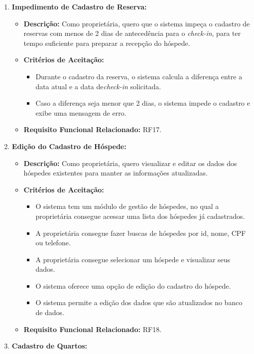 \documentclass[
	12pt,				%
	openany,			%
	oneside,			%
	a4paper,			%
	english,			%
	french,				%
	spanish,			%
	brazil				%
	]{abntex2}
\begin{document}
\begin{enumerate}[label=\textbf{\arabic*.}]
\begin{itemize}
	\end{itemize} 
	\item \textbf{Impedimento de Cadastro de Reserva:}
	\begin{itemize}
		\item \textbf{Descrição:} Como proprietária, quero que o sistema impeça o cadastro de reservas com menos de  2 dias de antecedência para o \textit{check-in}, para ter tempo suficiente para preparar a recepção do hóspede.
		\item \textbf{Critérios de Aceitação:}
		\begin{itemize}
			\item Durante o cadastro da reserva, o sistema calcula a diferença entre a data atual e a data de\textit{check-in} solicitada.
			\item Caso a diferença seja menor que 2 dias, o sistema impede o cadastro e exibe uma mensagem de erro.
		\end{itemize}
		\item \textbf{Requisito Funcional Relacionado:} RF17.
	\end{itemize} 
	\item \textbf{Edição do Cadastro de Hóspede:}
	\begin{itemize}
		\item \textbf{Descrição:} Como proprietária, quero visualizar e editar os dados dos hóspedes existentes para manter as informações atualizadas.
		\item \textbf{Critérios de Aceitação:}
		\begin{itemize}
			\item O sistema tem um módulo de gestão de hóspedes, no qual a proprietária consegue acessar uma lista dos hóspedes já cadastrados.
			\item A proprietária consegue fazer buscas de hóspedes por id, nome, CPF ou telefone.
			\item A proprietária consegue selecionar um hóspede e visualizar seus dados.
			\item O sistema oferece uma opção de edição do cadastro do hóspede.
			\item O sistema permite a edição dos dados que são atualizados no banco de dados.
		\end{itemize}
		\item \textbf{Requisito Funcional Relacionado:} RF18.
	\end{itemize} 
	\item \textbf{Cadastro de Quartos:}
	\begin{itemize}

\end{itemize}
\end{enumerate}
\end{document}
